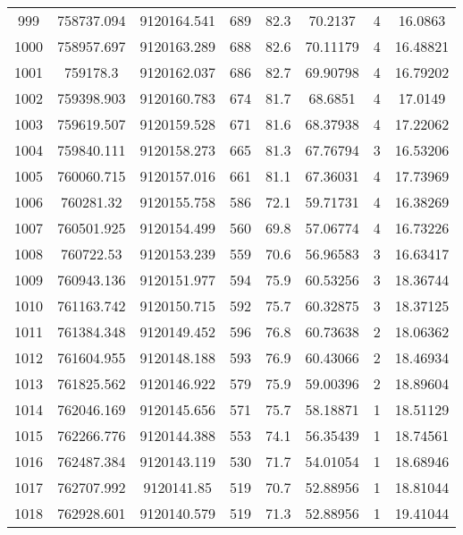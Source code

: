 \begin{longtable}{cccccccc}
999  & 758737.094      & 9120164.541      & 689     & 82.3  & 70.2137  & 4  & 16.0863  \\
1000 & 758957.697      & 9120163.289      & 688     & 82.6  & 70.11179 & 4  & 16.48821 \\
1001 & 759178.3        & 9120162.037      & 686     & 82.7  & 69.90798 & 4  & 16.79202 \\
1002 & 759398.903      & 9120160.783      & 674     & 81.7  & 68.6851  & 4  & 17.0149  \\
1003 & 759619.507      & 9120159.528      & 671     & 81.6  & 68.37938 & 4  & 17.22062 \\
1004 & 759840.111      & 9120158.273      & 665     & 81.3  & 67.76794 & 3  & 16.53206 \\
1005 & 760060.715      & 9120157.016      & 661     & 81.1  & 67.36031 & 4  & 17.73969 \\
1006 & 760281.32       & 9120155.758      & 586     & 72.1  & 59.71731 & 4  & 16.38269 \\
1007 & 760501.925      & 9120154.499      & 560     & 69.8  & 57.06774 & 4  & 16.73226 \\
1008 & 760722.53       & 9120153.239      & 559     & 70.6  & 56.96583 & 3  & 16.63417 \\
1009 & 760943.136      & 9120151.977      & 594     & 75.9  & 60.53256 & 3  & 18.36744 \\
1010 & 761163.742      & 9120150.715      & 592     & 75.7  & 60.32875 & 3  & 18.37125 \\
1011 & 761384.348      & 9120149.452      & 596     & 76.8  & 60.73638 & 2  & 18.06362 \\
1012 & 761604.955      & 9120148.188      & 593     & 76.9  & 60.43066 & 2  & 18.46934 \\
1013 & 761825.562      & 9120146.922      & 579     & 75.9  & 59.00396 & 2  & 18.89604 \\
1014 & 762046.169      & 9120145.656      & 571     & 75.7  & 58.18871 & 1  & 18.51129 \\
1015 & 762266.776      & 9120144.388      & 553     & 74.1  & 56.35439 & 1  & 18.74561 \\
1016 & 762487.384      & 9120143.119      & 530     & 71.7  & 54.01054 & 1  & 18.68946 \\
1017 & 762707.992      & 9120141.85       & 519     & 70.7  & 52.88956 & 1  & 18.81044 \\
1018 & 762928.601      & 9120140.579      & 519     & 71.3  & 52.88956 & 1  & 19.41044 \\

\end{longtable}
